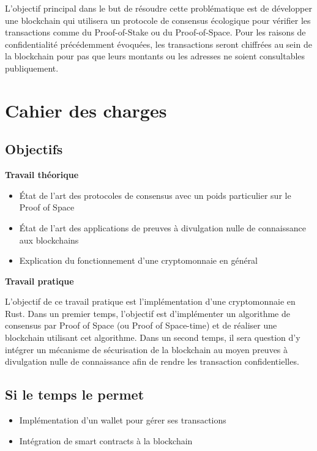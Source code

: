 L'objectif principal dans le but de résoudre cette problématique est de développer une blockchain qui utilisera un protocole de consensus écologique pour vérifier les transactions comme du Proof-of-Stake ou du Proof-of-Space. Pour les raisons de confidentialité précédemment évoquées, les transactions seront chiffrées au sein de la blockchain pour pas que leurs montants ou les adresses ne soient consultables publiquement.

\section*{Cahier des charges}

\subsection*{Objectifs}

\textbf{Travail théorique}
\begin{itemize}
    \item État de l'art des protocoles de consensus avec un poids particulier sur le Proof of Space
    \item État de l'art des applications de preuves à divulgation nulle de connaissance aux blockchains
    \item Explication du fonctionnement d'une cryptomonnaie en général
\end{itemize}

\textbf{Travail pratique}

L'objectif de ce travail pratique est l'implémentation d'une cryptomonnaie en Rust.
Dans un premier temps, l'objectif est d'implémenter un algorithme de consensus par Proof of Space (ou Proof of Space-time) et de réaliser une blockchain utilisant cet algorithme.
Dans un second temps, il sera question d'y intégrer un mécanisme de sécurisation de la blockchain au moyen preuves à divulgation nulle de connaissance afin de rendre les transaction confidentielles.

\subsection*{Si le temps le permet}

\begin{itemize}
    \item Implémentation d'un wallet pour gérer ses transactions
    \item Intégration de smart contracts à la blockchain
\end{itemize}

